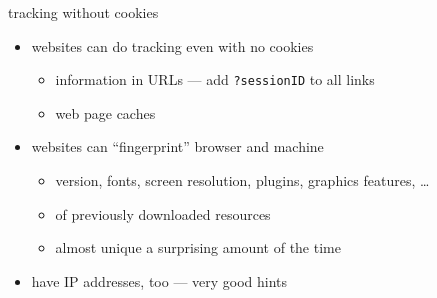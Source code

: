 
\begin{frame}[fragile,label=noCookieTrack]{tracking without cookies}
    \begin{itemize}
    \item websites can do tracking even with no cookies
        \begin{itemize}
        \item information in URLs --- add \texttt{?sessionID} to all links
        \item web page caches
        \end{itemize}
    \item websites can ``fingerprint'' browser and machine
        \begin{itemize}
        \item version, fonts, screen resolution, plugins, graphics features, \ldots
        \item {} of previously downloaded resources
        \item almost unique a surprising amount of the time
        \end{itemize}
    \item have IP addresses, too --- very good hints
    \end{itemize}
\end{frame}

